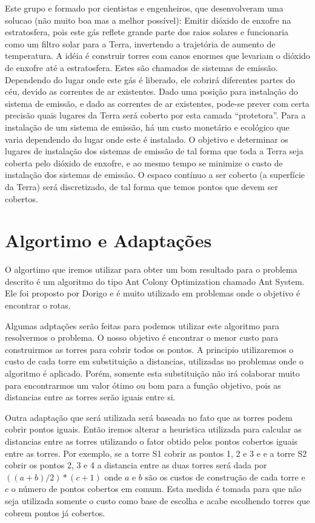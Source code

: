 \documentclass[12pt]{article}
\begin{document}
Este grupo e formado por cientistas e engenheiros, que desenvolveram
uma solucao (não muito boa mas a melhor possível): Emitir dióxido 
de enxofre na estratosfera, pois este gás reflete grande parte dos 
raios solares e funcionaria como um filtro solar para a Terra, 
invertendo a trajetória de aumento de temperatura. A idéia é construir 
torres com canos enormes que levariam o dióxido de enxofre até a estratosfera. 
Estes são chamados de sistemas de emissão. Dependendo do lugar onde 
este gás é liberado, ele cobrirá diferentes partes do céu, devido as 
correntes de ar existentes. Dado uma posição para instalação do sistema 
de emissão, e dado as correntes de ar existentes, pode-se prever com 
certa precisão quais lugares da Terra será coberto por esta camada 
“protetora”. Para a instalação de um sistema de emissão, há um custo 
monetário e ecológico que varia dependendo do lugar onde este é instalado. 
O objetivo e determinar os lugares de instalação dos sistemas de emissão 
de tal forma que toda a Terra seja coberta pelo dióxido de enxofre, e ao 
mesmo tempo se minimize o custo de instalação dos sistemas de emissão. 
O espaco contínuo a ser coberto (a superfície da Terra) será discretizado, 
de tal forma que temos pontos que devem ser cobertos. 

\section{Algortimo e Adaptações}

O algortimo que iremos utilizar para obter um bom resultado para o problema
descrito é um algoritmo do tipo Ant Colony Optimization chamado Ant System.
Ele foi proposto por Dorigo e é muito utilizado em problemas onde o objetivo
é encontrar o rotas.

Algumas adptações serão feitas para podemos utilizar este algoritmo para
resolvermos o problema. O nosso objetivo é encontrar o menor custo para 
construirmos as torres para cobrir todos os pontos. A principio utilizaremos
o custo de cada torre em substituição a distancias, utilizadas no problemas
onde o algoritmo é aplicado. Porém, somente esta substituição não irá
colaborar muito para encontrarmos um valor ótimo ou bom para a função 
objetivo, pois as distancias entre as torres serão iguais entre si.

Outra adaptação que será utilizada será baseada no fato que as torres podem
cobrir pontos iguais. Então iremos alterar a heuristica utilizada para calcular
as distancias entre as torres utilizando o fator obtido pelos pontos cobertos 
iguais entre as torres. Por exemplo, se a torre S1 cobrir as pontos 1, 2 e 3 e 
e a torre S2 cobrir os pontos 2, 3 e 4 a distancia entre as duas torres
será dada por $((a+b)/2)*(c+1)$ onde $a$ e $b$ são os custos de construção de 
cada torre e $c$ o número de pontos cobertos em comum. Esta medida é tomada
para que não seja utilizada somente o custo como base de escolha e acabe escolhendo
torres que cobrem pontos já cobertos.
\end{document}
